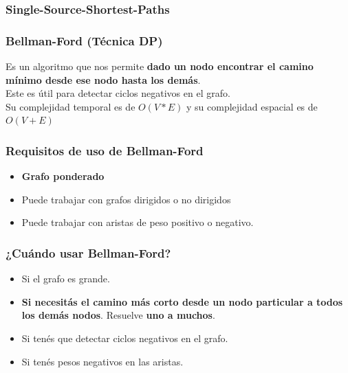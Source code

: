 \documentclass[10pt,a4paper]{article}
\begin{document}
\subsubsection*{Single-Source-Shortest-Paths}
\subsubsection*{Bellman-Ford (Técnica DP)}
Es un algoritmo que nos permite \textbf{dado un nodo encontrar el camino mínimo desde ese nodo hasta los demás}. \\
Este es útil para detectar ciclos negativos en el grafo. \\
Su complejidad temporal es de $O(V * E)$ y su complejidad espacial es de $O(V + E)$  
\subsubsection*{Requisitos de uso de Bellman-Ford}
\begin{itemize}
    \item \textbf{Grafo ponderado}
    \item Puede trabajar con grafos dirigidos o no dirigidos 
    \item Puede trabajar con aristas de peso positivo o negativo.
\end{itemize}
\subsubsection*{¿Cuándo usar Bellman-Ford?}
\begin{itemize}
    \item Si el grafo es grande. 
    \item \textbf{Si necesitás el camino más corto desde un nodo particular a todos los demás nodos}. Resuelve \textbf{uno a muchos}.
    \item Si tenés que detectar ciclos negativos en el grafo.
    \item Si tenés pesos negativos en las aristas.
\end{itemize}
\end{document}
